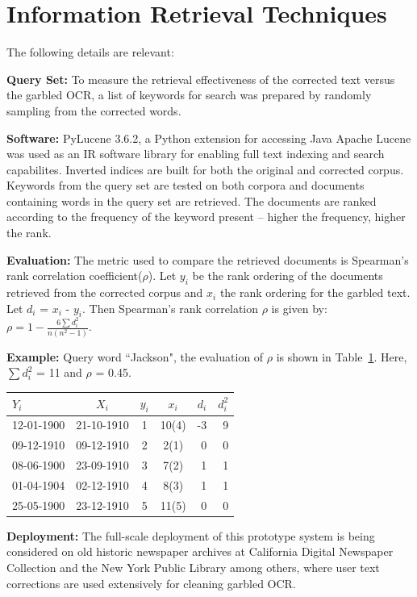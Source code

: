 \documentclass[letterpaper]{article}
\begin{document}
\section{Information Retrieval Techniques}
\label{ir}
The following details are relevant: 

\noindent \textbf{Query Set:} To measure the retrieval effectiveness of the corrected text versus the garbled OCR, a list of keywords for search was prepared by randomly sampling from the corrected words.

\noindent \textbf{Software:} PyLucene 3.6.2, a Python extension for accessing Java Apache Lucene was used as an IR software library for enabling full text indexing and search capabilites. Inverted indices are built for both the original and corrected corpus. Keywords from the query set are tested on both corpora and documents containing words in the query set are retrieved. The documents are ranked according to the frequency of the keyword present -- higher the frequency, higher the rank.
 
\noindent \textbf{Evaluation:} The metric used to compare the retrieved documents is Spearman's rank correlation coefficient($\rho$). Let $y_{i}$ be the rank ordering of the documents retrieved from the corrected corpus and $x_{i}$ the rank ordering for the garbled text. Let $d_{i}$ = $x_{i}$ - $y_{i}$. Then Spearman's rank correlation $\rho$ is given by: $\rho = 1 - \frac {6\sum d_i^2 }{n(n^2-1)}$.

\noindent \textbf{Example: } Query word ``Jackson", the evaluation of $\rho$ is shown in Table~\ref{ex}. Here, ${\sum d_i^2}$ = 11 and $\rho$ = 0.45.
\begin{table}[h]
\centering
\begin{tabular}{ l | c | c | c | r | r }
 $Y_{i}$ & $X_{i}$ & $y_{i}$ & $x_{i}$ & $d_{i}$ & $d_{i}^2$ \\
\hline
  12-01-1900 & 21-10-1910 & 1 & 10(4) & -3 & 9 \\
  09-12-1910 & 09-12-1910 & 2 & 2(1) & 0 & 0 \\
  08-06-1900 & 23-09-1910 & 3 & 7(2) & 1 & 1 \\
  01-04-1904 & 02-12-1910 & 4 & 8(3) & 1 & 1 \\
  25-05-1900 & 23-12-1910 & 5 & 11(5) & 0 & 0 \\
\end{tabular}
\label{ex}
\end{table}

\noindent \textbf{Deployment: }The full-scale deployment of this prototype system is being considered on old historic newspaper archives at California Digital Newspaper Collection and the New York Public Library among others, where  user text corrections are used extensively for cleaning garbled OCR. 
\end{document}
